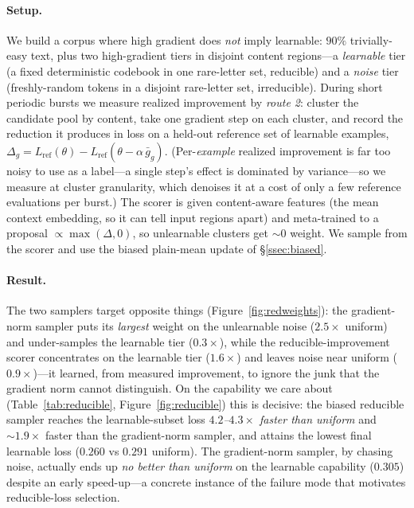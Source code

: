 \documentclass[11pt]{article}
\begin{document}
\paragraph{Setup.} We build a corpus where high gradient does \emph{not} imply
learnable: $90\%$ trivially-easy text, plus two high-gradient tiers in disjoint
content regions---a \emph{learnable} tier (a fixed deterministic codebook in one
rare-letter set, reducible) and a \emph{noise} tier (freshly-random tokens in a
disjoint rare-letter set, irreducible). During short periodic bursts we measure
realized improvement by \emph{route 2}: cluster the candidate pool by content,
take one gradient step on each cluster, and record the reduction it produces in
loss on a held-out reference set of learnable examples,
$\Delta_g = L_{\text{ref}}(\theta) - L_{\text{ref}}(\theta - \alpha\,\bar g_g)$.
(Per-\emph{example} realized improvement is far too noisy to use as a label---a
single step's effect is dominated by variance---so we measure at cluster
granularity, which denoises it at a cost of only a few reference evaluations per
burst.) The scorer is given content-aware features (the mean context embedding, so
it can tell input regions apart) and meta-trained to a proposal
$\propto\max(\Delta,0)$, so unlearnable clusters get $\sim\!0$ weight. We sample
from the scorer and use the biased plain-mean update of \S\ref{ssec:biased}.

\paragraph{Result.} The two samplers target opposite things
(Figure~\ref{fig:redweights}): the gradient-norm sampler puts its \emph{largest}
weight on the unlearnable noise ($2.5\times$ uniform) and under-samples the
learnable tier ($0.3\times$), while the reducible-improvement scorer concentrates
on the learnable tier ($1.6\times$) and leaves noise near uniform ($0.9\times$)---it
learned, from measured improvement, to ignore the junk that the gradient norm
cannot distinguish. On the capability we care about (Table~\ref{tab:reducible},
Figure~\ref{fig:reducible}) this is decisive: the biased reducible sampler reaches
the learnable-subset loss \emph{$4.2$--$4.3\times$ faster than uniform} and
$\sim\!1.9\times$ faster than the gradient-norm sampler, and attains the lowest
final learnable loss ($0.260$ vs $0.291$ uniform). The gradient-norm sampler, by
chasing noise, actually ends up \emph{no better than uniform} on the learnable
capability ($0.305$) despite an early speed-up---a concrete instance of the
failure mode that motivates reducible-loss selection.
\end{document}
